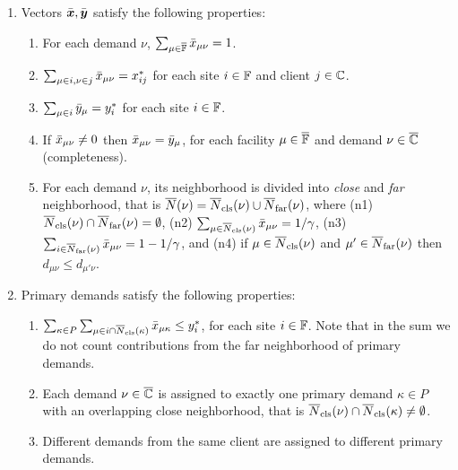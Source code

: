 \documentclass[11pt]{article}
\begin{document}
%
\begin{enumerate}
      \renewcommand{\theenumi}{P\arabic{enumi}}
      \renewcommand{\labelenumi}{(\theenumi)}
      \renewcommand{\theenumii}{(\alph{enumii})}
      \renewcommand{\labelenumii}{\theenumii}

\item Vectors $\bar{\boldsymbol{x}},\bar{\boldsymbol{y}}$ satisfy the following properties:
%
  \begin{enumerate}
	\item \label{PP1:one} For each demand $\nu$, $\sum_{\mu\in\overline{\mathbb{F}}}
    {\bar x}_{\mu\nu} = 1$.
	\item \label{PP1:xij} $\sum_{\mu\in i, \nu\in j} {\bar x}_{\mu\nu}
          = x_{ij}^\ast$ for each site $i\in\mathbb{F}$ and client $j\in\mathbb{C}$.
	\item \label{PP1:yi}
          $\sum_{\mu\in i} {\bar y}_{\mu} = y_i^\ast$ for each site $i\in\mathbb{F}$.
	\item \label{PP1:eq}
          If ${\bar x}_{\mu\nu}\neq 0$ then
				${\bar x}_{\mu\nu} = {\bar y}_{\mu}$, for each facility 
						$\mu\in\overline{\mathbb{F}}$ and demand
            $\nu\in\overline{\mathbb{C}}$ (completeness).

  \item \label{PP1:gamma} 
	For each demand $\nu$, its neighborhood is divided into \emph{close} and
	\emph{far} neighborhood, that is ${\overline{N}}(\nu) = {\overline{N}}_{\text{cls}}(\nu) \cup {\overline{N}}_{\text{far}}(\nu)$, where
(n1) ${\overline{N}}_{\text{cls}}(\nu) \cap {\overline{N}}_{\text{far}}(\nu) = \emptyset$,
(n2) $\sum_{\mu\in{\overline{N}}_{\text{cls}}(\nu)} {\bar x}_{\mu\nu} =1/\gamma$,
(n3) $\sum_{i\in{\overline{N}}_{\text{far}}(\nu)} {\bar x}_{\mu\nu} =1-1/\gamma$,
and 
(n4) if $\mu\in {\overline{N}}_{\text{cls}}(\nu)$ and $\mu'\in {\overline{N}}_{\text{far}}(\nu)$ then $d_{\mu\nu}\le d_{\mu'\nu}$.   

  \end{enumerate}

\item Primary demands satisfy the following properties:
%
\begin{enumerate}
\item \label{PP2:yi} $\sum_{\kappa\in P} \sum_{\mu\in i\cap
    {\overline{N}}_{\text{cls}}(\kappa)}{\bar x}_{\mu\kappa} \leq y_i^\ast$, for
  each site $i\in\mathbb{F}$. Note that in the sum
  we do not count contributions from
  the far neighborhood of primary demands.
\item \label{PP2:assign} Each demand $\nu\in\overline{\mathbb{C}}$ is
  assigned to exactly one primary demand $\kappa\in P$ with
  an overlapping close neighborhood, that is
  ${\overline{N}}_{\text{cls}}(\nu) \cap {\overline{N}}_{\text{cls}}(\kappa) \neq \emptyset$.
\item \label{PP2:diff} Different demands from the same
  client are assigned to different primary demands.


\end{enumerate}
\end{enumerate}
\end{document}
